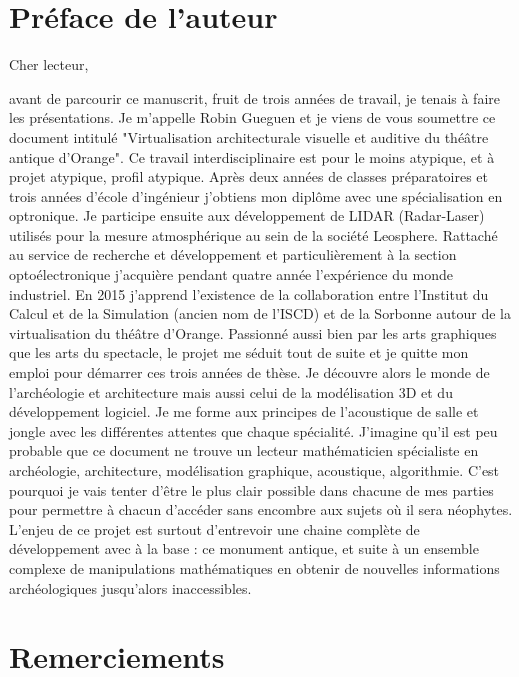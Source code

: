 \chapter*{Préface de l'auteur}

Cher lecteur,


avant de parcourir ce manuscrit, fruit de trois années de travail, je tenais à faire les présentations. Je m'appelle Robin Gueguen et je viens de vous soumettre ce document intitulé "Virtualisation architecturale visuelle et auditive du théâtre antique d'Orange". Ce travail interdisciplinaire est pour le moins atypique, et à projet atypique, profil atypique. Après deux années de classes préparatoires et trois années d'école d'ingénieur j'obtiens mon diplôme avec une spécialisation en optronique. Je participe ensuite aux développement de LIDAR (Radar-Laser) utilisés pour la mesure atmosphérique au sein de la société Leosphere. Rattaché au service de recherche et développement et particulièrement à la section optoélectronique j'acquière pendant quatre année l'expérience du monde industriel. En 2015 j'apprend l'existence de la collaboration entre l'Institut du Calcul et de la Simulation (ancien nom de l'ISCD) et de la Sorbonne autour de la virtualisation du théâtre d'Orange. Passionné aussi bien par les arts graphiques que les arts du spectacle, le projet me séduit tout de suite et je quitte mon emploi pour démarrer ces trois années de thèse. Je découvre alors le monde de l'archéologie et architecture mais aussi celui de la modélisation 3D et du développement logiciel. Je me forme aux principes de l'acoustique de salle et jongle avec les différentes attentes que chaque spécialité. J'imagine qu'il est peu probable que ce document ne trouve un lecteur mathématicien spécialiste en archéologie, architecture, modélisation graphique, acoustique, algorithmie. C'est pourquoi je vais tenter d'être le plus clair possible dans chacune de mes parties pour permettre à chacun d'accéder sans encombre aux sujets où il sera néophytes. L'enjeu de ce projet est surtout d'entrevoir une chaine complète de développement avec à la base : ce monument antique, et suite à un ensemble complexe de manipulations mathématiques en obtenir de nouvelles informations archéologiques jusqu'alors inaccessibles. 

\newpage
\chapter*{Remerciements}

